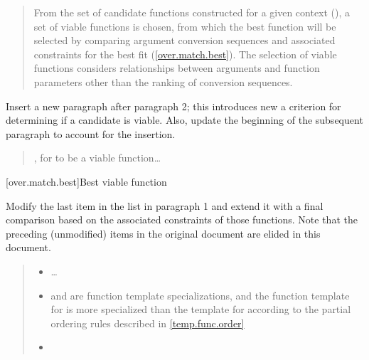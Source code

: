 \begin{quote}
\pnum
From the set of candidate functions constructed for a given context 
(), a set of viable functions is chosen, from which 
the best function will be selected by comparing argument conversion 
sequences and associated constraints for the best fit 
(\ref{over.match.best}).
%
The selection of viable functions considers  relationships between arguments and function 
parameters other than the ranking of conversion sequences.
\end{quote}

Insert a new paragraph after paragraph 2; this introduces new a criterion for 
determining if a candidate is viable. Also, update the beginning of the 
subsequent paragraph to account for the insertion.

\begin{quote}
\setcounter{Paras}{2}
\pnum
{}

\pnum
{}, for  to be a viable function\ldots
\end{quote}

[over.match.best]{Best viable function}

Modify the last item in the list in paragraph 1 and extend it with a final
comparison based on the associated constraints of those functions. Note that 
the preceding (unmodified) items in the original document are elided in this
document.

\begin{quote}
\begin{itemize}
\item \ldots

\item {} and  are function template specializations, and 
the function template for  is more specialized than the template 
for  according to the partial ordering rules described in
\ref{temp.func.order}

\item
{}
\end{itemize}
\end{quote}


